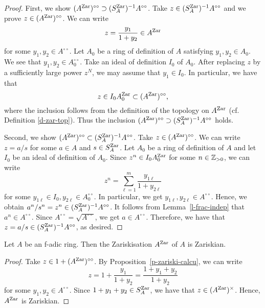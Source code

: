\begin{proof}
First, we show $(A^{{\operatorname{Zar}}})^{\circ\circ} \supset (S^{{\operatorname{Zar}}}_A)^{-1}A^{\circ\circ}$. 
Take $z \in (S^{{\operatorname{Zar}}}_A)^{-1}A^{\circ\circ}$ 
and we prove $z \in (A^{{\operatorname{Zar}}})^{\circ\circ}$. 
We can write 
$$z=\frac{y_1}{1+y_2} \in A^{{\operatorname{Zar}}}$$ 
for some $y_1, y_2 \in A^{\circ\circ}$. 
Let $A_0$ be a ring of definition of $A$ satisfying $y_1, y_2 \in A_0$. 
We see that $y_1, y_2 \in A_0^{\circ\circ}$. 
Take an ideal of definition $I_0$ of $A_0$. 
After replacing $z$ by a sufficiently large power $z^N$, 
we may assume that $y_1 \in I_0$. 
In particular, we have that 
$$z \in I_0A_0^{{\operatorname{Zar}}} \subset (A^{{\operatorname{Zar}}})^{\circ\circ},$$
where the inclusion follows from the definition of the topology on $A^{{\operatorname{Zar}}}$ (cf. Definition \ref{d-zar-top}). 
Thus the inclusion $(A^{{\operatorname{Zar}}})^{\circ\circ} \supset (S^{{\operatorname{Zar}}}_A)^{-1}A^{\circ\circ}$ 
holds. 

Second, we show $(A^{{\operatorname{Zar}}})^{\circ\circ} \subset (S^{{\operatorname{Zar}}}_A)^{-1}A^{\circ\circ}$. 
Take $z \in (A^{{\operatorname{Zar}}})^{\circ\circ}$. 
We can write  $z=a/s$ for some $a \in A$ and $s \in S^{{\operatorname{Zar}}}_A$. 
Let $A_0$ be a ring of definition of $A$ and 
let $I_0$ be an ideal of definition of $A_0$. 
Since $z^n \in I_0A_0^{{\operatorname{Zar}}}$ for some $n \in \mathbb{Z}_{>0}$, 
we can write 
$$z^n=\sum_{\ell=1}^m \frac{y_{1\ell}}{1+y_{2\ell}}$$ 
for some $y_{1\ell} \in I_0, y_{2\ell} \in A_0^{\circ\circ}$. 
In particular, we get $y_{1\ell}, y_{2\ell} \in A^{\circ\circ}$. 
Hence, we obtain $a^n/s^n=z^n \in (S^{{\operatorname{Zar}}}_A)^{-1}A^{\circ\circ}$. 
It follows from Lemma~\ref{l-frac-indep} that $a^n \in A^{\circ\circ}$. 
Since $A^{\circ\circ}=\sqrt{A^{\circ\circ}}$, we get $a \in A^{\circ\circ}$. 
Therefore, we have that $z=a/s \in (S^{{\operatorname{Zar}}}_A)^{-1}A^{\circ\circ}$, as desired. 
\end{proof}



\begin{thm}\label{t-zar-zar}
Let $A$ be an f-adic ring. 
Then the Zariskisation $A^{{\operatorname{Zar}}}$ of $A$ is Zariskian. 
\end{thm}

\begin{proof}
Take $z \in 1+(A^{{\operatorname{Zar}}})^{\circ\circ}$. 
By Proposition~\ref{p-zariski-calcu}, we can write 
$$z=1+\frac{y_1}{1+y_2}=\frac{1+y_1+y_2}{1+y_2}$$ 
for some $y_1, y_2 \in A^{\circ\circ}$. 
Since $1+y_1+y_2 \in S_A^{{\operatorname{Zar}}}$, 
we have that $z \in (A^{{\operatorname{Zar}}})^{\times}$. 
Hence, $A^{{\operatorname{Zar}}}$ is Zariskian. 
\end{proof}




